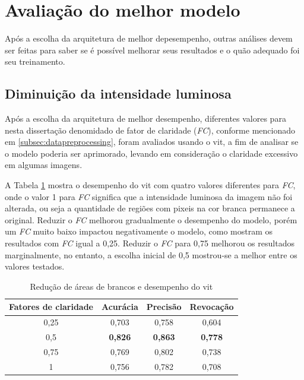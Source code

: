 \section{Avaliação do melhor modelo}\label{sec:bestmodel}

Após a escolha da arquitetura de melhor depesempenho, outras análises devem ser feitas para saber se é possível melhorar seus resultados e o quão adequado foi seu treinamento.

\subsection{Diminuição da intensidade luminosa}
Após a escolha da arquitetura de melhor desempenho, diferentes valores para nesta dissertação denomidado de fator de claridade (\textit{FC}), conforme mencionado em \ref{subsec:datapreprocessing}, foram avaliados usando o \acrshort{vit}, a fim de analisar se o modelo poderia ser aprimorado, levando em consideração o claridade excessivo em algumas imagens.

A Tabela \ref{tab:brightnessfactor} mostra o desempenho do \acrshort{vit} com quatro valores diferentes para \textit{FC}, onde o valor 1 para \textit{FC} significa que a intensidade luminosa da imagem não foi alterada, ou seja a quantidade de regiões com pixeis na cor branca permanece a original. 
Reduzir o \textit{FC} melhorou gradualmente o desempenho do modelo, porém um \textit{FC} muito baixo impactou negativamente o modelo, como mostram os resultados com \textit{FC} igual a 0,25. Reduzir o \textit{FC} para 0,75 melhorou os resultados marginalmente, no entanto, a escolha inicial de 0,5 mostrou-se a melhor entre os valores testados.

\begin{table}[tb]
\caption{\label{tab:brightnessfactor} Redução de áreas de brancos e desempenho do \acrshort{vit}}
\begin{center}
\begin{tabular}{c|ccc}
\toprule
 Fatores de claridade & Acurácia &  Precisão  & Revocação \\
\midrule
     0,25 & 0,703 & 0,758 & 0,604 \\
     0,5 & \textbf{0,826} & \textbf{0,863} & \textbf{0,778} \\
     0,75 & 0,769 & 0,802 & 0,738 \\
     1 & 0,756 & 0,782 & 0,708 \\
\bottomrule
\end{tabular}
\end{center}
\end{table}

